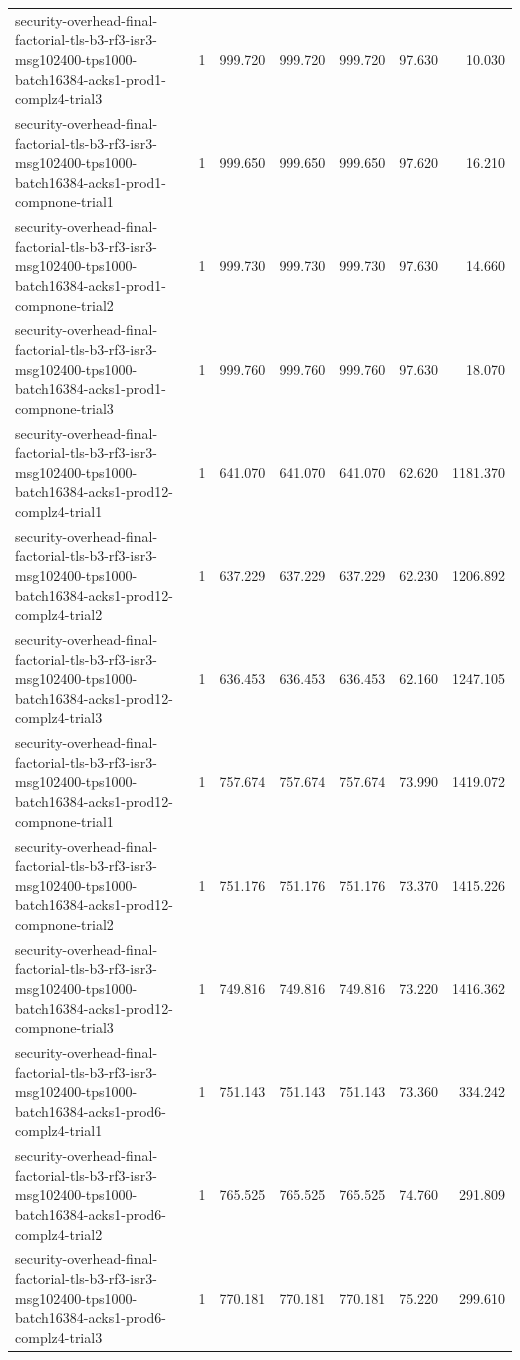 \begin{tabular}{lrrrrrr}
security-overhead-final-factorial-tls-b3-rf3-isr3-msg102400-tps1000-batch16384-acks1-prod1-complz4-trial3 & 1 & 999.720 & 999.720 & 999.720 & 97.630 & 10.030 \\
security-overhead-final-factorial-tls-b3-rf3-isr3-msg102400-tps1000-batch16384-acks1-prod1-compnone-trial1 & 1 & 999.650 & 999.650 & 999.650 & 97.620 & 16.210 \\
security-overhead-final-factorial-tls-b3-rf3-isr3-msg102400-tps1000-batch16384-acks1-prod1-compnone-trial2 & 1 & 999.730 & 999.730 & 999.730 & 97.630 & 14.660 \\
security-overhead-final-factorial-tls-b3-rf3-isr3-msg102400-tps1000-batch16384-acks1-prod1-compnone-trial3 & 1 & 999.760 & 999.760 & 999.760 & 97.630 & 18.070 \\
security-overhead-final-factorial-tls-b3-rf3-isr3-msg102400-tps1000-batch16384-acks1-prod12-complz4-trial1 & 1 & 641.070 & 641.070 & 641.070 & 62.620 & 1181.370 \\
security-overhead-final-factorial-tls-b3-rf3-isr3-msg102400-tps1000-batch16384-acks1-prod12-complz4-trial2 & 1 & 637.229 & 637.229 & 637.229 & 62.230 & 1206.892 \\
security-overhead-final-factorial-tls-b3-rf3-isr3-msg102400-tps1000-batch16384-acks1-prod12-complz4-trial3 & 1 & 636.453 & 636.453 & 636.453 & 62.160 & 1247.105 \\
security-overhead-final-factorial-tls-b3-rf3-isr3-msg102400-tps1000-batch16384-acks1-prod12-compnone-trial1 & 1 & 757.674 & 757.674 & 757.674 & 73.990 & 1419.072 \\
security-overhead-final-factorial-tls-b3-rf3-isr3-msg102400-tps1000-batch16384-acks1-prod12-compnone-trial2 & 1 & 751.176 & 751.176 & 751.176 & 73.370 & 1415.226 \\
security-overhead-final-factorial-tls-b3-rf3-isr3-msg102400-tps1000-batch16384-acks1-prod12-compnone-trial3 & 1 & 749.816 & 749.816 & 749.816 & 73.220 & 1416.362 \\
security-overhead-final-factorial-tls-b3-rf3-isr3-msg102400-tps1000-batch16384-acks1-prod6-complz4-trial1 & 1 & 751.143 & 751.143 & 751.143 & 73.360 & 334.242 \\
security-overhead-final-factorial-tls-b3-rf3-isr3-msg102400-tps1000-batch16384-acks1-prod6-complz4-trial2 & 1 & 765.525 & 765.525 & 765.525 & 74.760 & 291.809 \\
security-overhead-final-factorial-tls-b3-rf3-isr3-msg102400-tps1000-batch16384-acks1-prod6-complz4-trial3 & 1 & 770.181 & 770.181 & 770.181 & 75.220 & 299.610 \\

\end{tabular}
